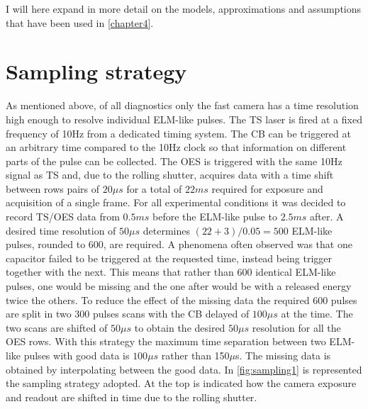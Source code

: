 

I will here expand in more detail on the models, approximations and assumptions that have been used in \autoref{chapter4}.

\section{Sampling strategy}\label{Sampling strategy}

As mentioned above, of all diagnostics only the fast camera has a time resolution high enough to resolve individual ELM-like pulses. The TS laser is fired at a fixed frequency of 10Hz from a dedicated timing system. The CB can be triggered at an arbitrary time compared to the 10Hz clock so that information on different parts of the pulse can be collected. The OES is triggered with the same 10Hz signal as TS and, due to the rolling shutter, acquires data with a time shift between rows pairs of $20\mu s$ for a total of $22ms$ required for exposure and acquisition of a single frame. For all experimental conditions it was decided to record TS/OES data from $0.5ms$ before the ELM-like pulse to $2.5ms$ after. A desired time resolution of $50\mu s$ determines $(22+3)/0.05=500$ ELM-like pulses, rounded to 600, are required. A phenomena often observed was that one capacitor failed to be triggered at the requested time, instead being trigger together with the next. This means that rather than 600 identical ELM-like pulses, one would be missing and the one after would be with a released energy twice the others. To reduce the effect of the missing data the required 600 pulses are split in two 300 pulses scans with the CB delayed of $100\mu s$ at the time. The two scans are shifted of $50\mu s$ to obtain the desired $50\mu s$ resolution for all the OES rows. With this strategy the maximum time separation between two ELM-like pulses with good data is $100\mu s$ rather than 150$\mu$s. The missing data is obtained by interpolating between the good data. In \autoref{fig:sampling1} is represented the sampling strategy adopted. At the top is indicated how the camera exposure and readout are shifted in time due to the rolling shutter. 

